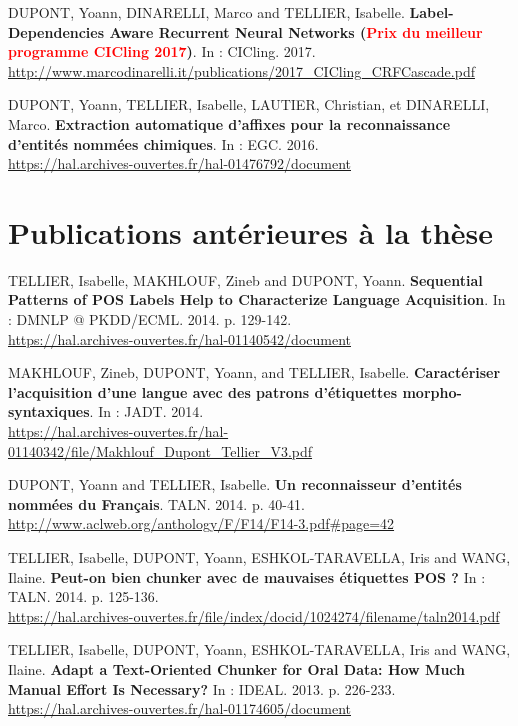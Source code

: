 \documentclass[12pt,a4paper,times,twoside,openright]{report}
\begin{document}
    DUPONT, Yoann, DINARELLI, Marco and TELLIER, Isabelle. \textbf{Label-Dependencies Aware Recurrent Neural Networks (\textcolor{red}{Prix du meilleur programme CICling 2017})}. In : CICling. 2017.\\
    \url{http://www.marcodinarelli.it/publications/2017_CICling_CRFCascade.pdf}
    
    DUPONT, Yoann, TELLIER, Isabelle, LAUTIER, Christian, et DINARELLI, Marco. \textbf{Extraction automatique d'affixes pour la reconnaissance d'entités nommées chimiques}. In : EGC. 2016.\\
    \url{https://hal.archives-ouvertes.fr/hal-01476792/document}
    
    
    
    \section*{Publications antérieures à la thèse}
    
    TELLIER, Isabelle, MAKHLOUF, Zineb and DUPONT, Yoann. \textbf{Sequential Patterns of POS Labels Help to Characterize Language Acquisition}. In : DMNLP @ PKDD/ECML. 2014. p. 129-142.\\
    \url{https://hal.archives-ouvertes.fr/hal-01140542/document}
    
    MAKHLOUF, Zineb, DUPONT, Yoann, and TELLIER, Isabelle. \textbf{Caractériser l'acquisition d'une langue avec des patrons d'étiquettes morpho-syntaxiques}. In : JADT. 2014.\\
    \url{https://hal.archives-ouvertes.fr/hal-01140342/file/Makhlouf_Dupont_Tellier_V3.pdf}
    
    DUPONT, Yoann and TELLIER, Isabelle. \textbf{Un reconnaisseur d'entités nommées du Français}. TALN. 2014. p. 40-41.\\
    \url{http://www.aclweb.org/anthology/F/F14/F14-3.pdf#page=42}
    
    TELLIER, Isabelle, DUPONT, Yoann, ESHKOL-TARAVELLA, Iris and WANG, Ilaine. \textbf{Peut-on bien chunker avec de mauvaises étiquettes POS ?} In : TALN. 2014. p. 125-136.\\
    \url{https://hal.archives-ouvertes.fr/file/index/docid/1024274/filename/taln2014.pdf}
    
    TELLIER, Isabelle, DUPONT, Yoann, ESHKOL-TARAVELLA, Iris and WANG, Ilaine. \textbf{Adapt a Text-Oriented Chunker for Oral Data: How Much Manual Effort Is Necessary?} In : IDEAL. 2013. p. 226-233.\\
    \url{https://hal.archives-ouvertes.fr/hal-01174605/document}
    
\end{document}
